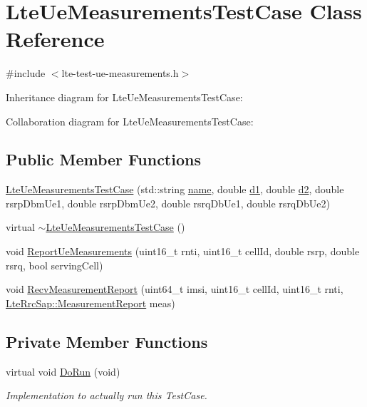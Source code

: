\hypertarget{classLteUeMeasurementsTestCase}{}\section{Lte\+Ue\+Measurements\+Test\+Case Class Reference}
\label{classLteUeMeasurementsTestCase}


{\ttfamily \#include $<$lte-\/test-\/ue-\/measurements.\+h$>$}



Inheritance diagram for Lte\+Ue\+Measurements\+Test\+Case\+:


Collaboration diagram for Lte\+Ue\+Measurements\+Test\+Case\+:
\subsection*{Public Member Functions}
\begin{DoxyCompactItemize}
\item 
\hyperlink{classLteUeMeasurementsTestCase_a732c7c11b4d62618740dfea27d794dc1}{Lte\+Ue\+Measurements\+Test\+Case} (std\+::string \hyperlink{generate__test__data__lte__spectrum__model_8m_ab74e6bf80237ddc4109968cedc58c151}{name}, double \hyperlink{lte__uplink__power__control_8m_a6a56223849c00f2bb062c6e55d2954df}{d1}, double \hyperlink{lte__link__budget__interference__fr_8m_a479b78c01efbe4664b402a300da492f7}{d2}, double rsrp\+Dbm\+Ue1, double rsrp\+Dbm\+Ue2, double rsrq\+Db\+Ue1, double rsrq\+Db\+Ue2)
\item 
virtual \hyperlink{classLteUeMeasurementsTestCase_a3605335cd401319ca29408abb6bb3bef}{$\sim$\+Lte\+Ue\+Measurements\+Test\+Case} ()
\item 
void \hyperlink{classLteUeMeasurementsTestCase_a7f7c986ca0fc0890d7d3e8d784860859}{Report\+Ue\+Measurements} (uint16\+\_\+t rnti, uint16\+\_\+t cell\+Id, double rsrp, double rsrq, bool serving\+Cell)
\item 
void \hyperlink{classLteUeMeasurementsTestCase_ae8212608829de68ab7f07a8b1a407d18}{Recv\+Measurement\+Report} (uint64\+\_\+t imsi, uint16\+\_\+t cell\+Id, uint16\+\_\+t rnti, \hyperlink{structns3_1_1LteRrcSap_1_1MeasurementReport}{Lte\+Rrc\+Sap\+::\+Measurement\+Report} meas)
\end{DoxyCompactItemize}
\subsection*{Private Member Functions}
\begin{DoxyCompactItemize}
\item 
virtual void \hyperlink{classLteUeMeasurementsTestCase_a6ead76e605e0d03f6e9ea74b6bf608aa}{Do\+Run} (void)
\begin{DoxyCompactList}\small\item\em Implementation to actually run this Test\+Case. \end{DoxyCompactList}\end{DoxyCompactItemize}
